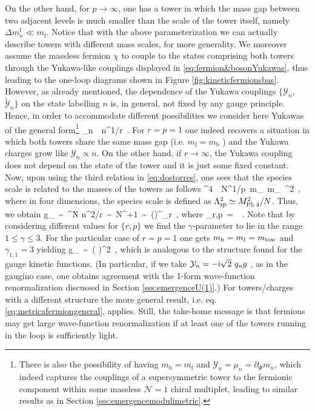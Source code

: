 On the other hand, for $p\rightarrow \infty$, one has a tower in which the mass gap between two adjacent levels is much smaller than the scale of the tower itself, namely $\Delta m^{\mathrm{f}}_n \ll m_{\mathrm{f}}$. Notice that with the above parameterization we can actually describe towers with different mass scales, for more generality. We moreover assume the massless fermion $\chi$ to couple to the states comprising both towers through the Yukawa-like couplings displayed in \eqref{eq:fermion&bosonYukawas}, thus leading to the one-loop diagrams shown in Figure \ref{fig:kineticfermionsbas}. However, as already mentioned, the dependence of the Yukawa couplings  $\{\mathcal{Y}_n$, $\tilde{\mathcal{Y}}_n\}$ on the state labelling $n$ is, in general, not fixed by any gauge principle. Hence, in order to accommodate different possibilities we consider here Yukawas of the general form\footnote{There is also the possibility of having $m_{{\text{b}}}=m_{{\text{f}}}$ and $\mathcal{Y}_n = \mu_n = \partial_{\Phi} m_n$, which indeed captures the couplings of a supersymmetric tower to the fermionic component within some massless $\mathcal{N}=1$ chiral multiplet, leading to similar results as in Section \ref{sss:emergencemodulimetric}.}
%
\beq
	_n\, \propto\, n^{1/r}\, .
\eeq
%
For $r=p=1$ one indeed recovers a situation in which both towers share the same mass gap (i.e. $m_{\mathrm{f}}=m_{\mathrm{b}}$ ) and the Yukawa charges grow like $\mathcal{Y}_n \propto n$. %
On the other hand, if $r\rightarrow \infty$, the Yukawa coupling does not depend on the state of the tower and it is just some fixed constant. Now, upon using the third relation in \eqref{eq:dostorres}, one sees that the species scale is related to the masses of the towers as follows
%
\beq
	\LSP^4\, \simeq\, N^{1/p}\, m_{}\, m_{}\, \Mpf^2\, ,
\eeq
%
where in four dimensions, the species scale is defined as $\Lambda_{\text{sp}}^2 \simeq M_{\text{Pl;}\, 4}^2/N$. Thus, we obtain
%
\beq
	g_{\chi \chi}\, \sim\,  \sum^{N} n^{2/r}\, \sim\, N^{+1}\, \sim\, \left(\right)^{\gamma_r}\, ,
\label{eq:metricafermiongeneral}
\eeq
%
where
%
\beq
	\gamma_{r,p}\, =\, \, .
\eeq
%
 Note that by considering different values for $\{r,p\}$ we find the $\gamma$-parameter to lie in the range $1\leq \gamma \leq 3$. For the particular case of $r=p=1$ one gets $m_{\mathrm{b}}=m_{\mathrm{f}}=m_{\text{tow}}$  and $\gamma_{1,1}=3$ yielding\cite{Palti:2020tsy}
%
\beq
	g_{\chi\chi}\, \sim\, \left( \frac {\Mpf}{\Mt}\right)^2\, ,
\eeq
%
which is analogous to the structure found for the gauge kinetic functions. (In particular, if we take $\mathcal{Y}_n = -\text{i} \sqrt{2}\ q_n g$ \cite{Wess:1992cp}, as in the gaugino case, one obtains agreement with the 1-form wave-function renormalization discussed in Section \ref{sss:emergenceU(1)}.) For towers/charges with a different structure the more general result, i.e. eq. \eqref{eq:metricafermiongeneral}, applies. Still, the take-home message is that fermions may get large wave-function renormalization if at least one of the towers running in the loop is sufficiently light. 

